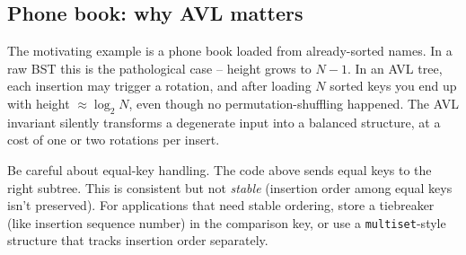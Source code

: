 \documentclass[11pt]{article}
\begin{document}
\subsection*{Phone book: why AVL matters}

The motivating example is a phone book loaded from already-sorted names. In a raw BST this is the pathological case -- height grows to $N - 1$. In an AVL tree, each insertion may trigger a rotation, and after loading $N$ sorted keys you end up with height $\approx \log_2 N$, even though no permutation-shuffling happened. The AVL invariant silently transforms a degenerate input into a balanced structure, at a cost of one or two rotations per insert.

\begin{warnbox}
Be careful about equal-key handling. The code above sends equal keys to the right subtree. This is consistent but not \emph{stable} (insertion order among equal keys isn't preserved). For applications that need stable ordering, store a tiebreaker (like insertion sequence number) in the comparison key, or use a \texttt{multiset}-style structure that tracks insertion order separately.
\end{warnbox}
\end{document}
